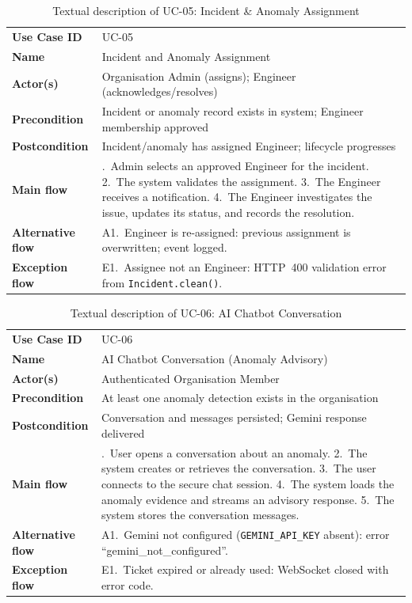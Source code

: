 \begin{longtable}{@{}>{\raggedright\arraybackslash}p{} >{\raggedright\arraybackslash}p{}@{}}
\caption{Textual description of UC-05: Incident \& Anomaly Assignment}\label{tab:uc05}\\
\toprule
\textbf{Use Case ID} & UC-05\\
\textbf{Name} & Incident and Anomaly Assignment\\
\textbf{Actor(s)} & Organisation Admin (assigns); Engineer (acknowledges/resolves)\\
\textbf{Precondition} & Incident or anomaly record exists in system; Engineer membership approved\\
\textbf{Postcondition} & Incident/anomaly has assigned Engineer; lifecycle progresses\\
\textbf{Main flow} &
  1.~Admin selects an approved Engineer for the incident.
  2.~The system validates the assignment.
  3.~The Engineer receives a notification.
  4.~The Engineer investigates the issue, updates its status, and records the resolution.\\
\textbf{Alternative flow} &
  A1.~Engineer is re-assigned: previous assignment is overwritten; event logged.\\
\textbf{Exception flow} &
  E1.~Assignee not an Engineer: HTTP~400 validation error from \texttt{Incident.clean()}.\\
\bottomrule
\end{longtable}

\begin{longtable}{@{}>{\raggedright\arraybackslash}p{} >{\raggedright\arraybackslash}p{}@{}}
\caption{Textual description of UC-06: AI Chatbot Conversation}\label{tab:uc06}\\
\toprule
\textbf{Use Case ID} & UC-06\\
\textbf{Name} & AI Chatbot Conversation (Anomaly Advisory)\\
\textbf{Actor(s)} & Authenticated Organisation Member\\
\textbf{Precondition} & At least one anomaly detection exists in the organisation\\
\textbf{Postcondition} & Conversation and messages persisted; Gemini response delivered\\
\textbf{Main flow} &
  1.~User opens a conversation about an anomaly.
  2.~The system creates or retrieves the conversation.
  3.~The user connects to the secure chat session.
  4.~The system loads the anomaly evidence and streams an advisory response.
  5.~The system stores the conversation messages.\\
\textbf{Alternative flow} &
  A1.~Gemini not configured (\texttt{GEMINI\_API\_KEY} absent): error ``gemini\_not\_configured''.\\
\textbf{Exception flow} &
  E1.~Ticket expired or already used: WebSocket closed with error code.\\
\bottomrule
\end{longtable}


